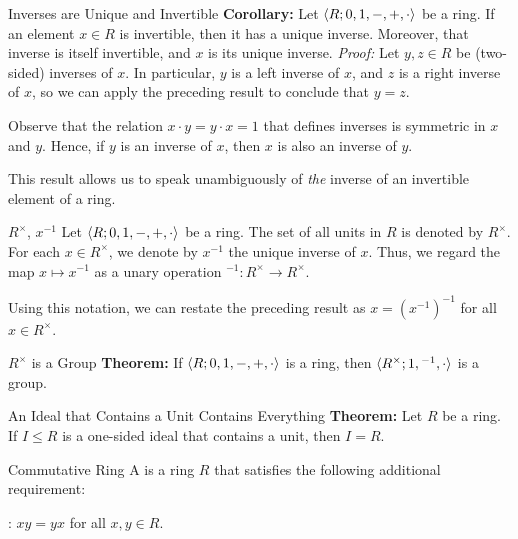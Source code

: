 \documentclass[12pt]{report}
\begin{document}
\begin{thmbox}{Inverses are Unique and Invertible}
	\textbf{Corollary:} Let ${\langle {R; 0, 1, -, +, \cdot} \rangle}$ be a ring. If an element $x \in R$ is invertible, then it has a unique inverse. Moreover, that inverse is itself invertible, and $x$ is its unique inverse.
\tcblower
	\textit{Proof:} Let $y,z \in R$ be (two-sided) inverses of $x$. In particular, $y$ is a left inverse of $x$, and $z$ is a right inverse of $x$, so we can apply the preceding result to conclude that $y = z$.

	Observe that the relation $x \cdot y = y \cdot x = 1$ that defines inverses is symmetric in $x$ and $y$. Hence, if $y$ is an inverse of $x$, then $x$ is also an inverse of $y$.
\end{thmbox}

This result allows us to speak unambiguously of \textit{the} inverse of an invertible element of a ring.

\begin{dfnbox}{$R^\times$, $x^{-1}$}
	Let ${\langle {R; 0, 1, -, +, \cdot} \rangle}$ be a ring. The set of all units in $R$ is denoted by $R^\times$. For each $x \in R^\times$, we denote by $x^{-1}$ the unique inverse of $x$. Thus, we regard the map $x \mapsto x^{-1}$ as a unary operation ${}^{-1}: R^\times \to R^\times$.
\end{dfnbox}

Using this notation, we can restate the preceding result as $x = (x^{-1})^{-1}$ for all $x \in R^\times$.

\begin{thmbox}{$R^\times$ is a Group}
	\textbf{Theorem:} If ${\langle {R; 0, 1, -, +, \cdot} \rangle}$ is a ring, then ${\langle {R^\times; 1, {}^{-1}, \cdot} \rangle}$ is a group.
\end{thmbox}

\begin{thmbox}{An Ideal that Contains a Unit Contains Everything}
	\textbf{Theorem:} Let $R$ be a ring. If $I \le R$ is a one-sided ideal that contains a unit, then $I = R$.
\end{thmbox}

\begin{dfnbox}{Commutative Ring}
	A  is a ring $R$ that satisfies the following additional requirement:
	\begin{dfnitems}
		\item {}: $xy = yx$ for all $x, y \in R$.
	\end{dfnitems}
\end{dfnbox}
\end{document}
